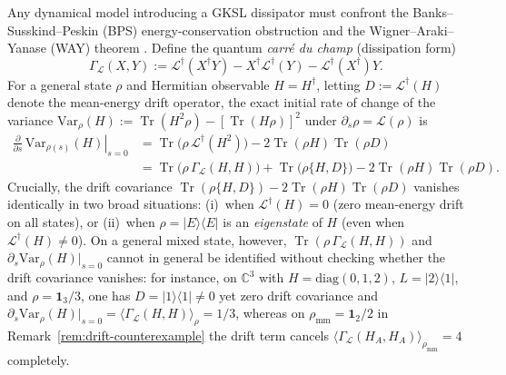 \documentclass[11pt,a4paper]{article}
\theoremstyle{definition}
\theoremstyle{remark}
\newcommand{\Tr}{\operatorname{Tr}}
\newcommand{\cL}{\mathcal{L}}
\newcommand{\bbC}{\mathbb{C}}
\newcommand{\1}{\mathbf{1}}
\begin{document}
Any dynamical model introducing a GKSL dissipator must confront the Banks--Susskind--Peskin (BPS) energy-conservation obstruction \cite{BPS1984} and the Wigner--Araki--Yanase (WAY) theorem \cite{KuramochiTajima2023}. Define the quantum \emph{carr\'e du champ} (dissipation form)
\begin{equation}\label{eq:cdc}
  \Gamma_{\cL}(X, Y) := \cL^\dagger(X^\dagger Y) - X^\dagger \cL^\dagger(Y) - \cL^\dagger(X^\dagger) Y.
\end{equation}
For a general state $\rho$ and Hermitian observable $H = H^\dagger$, letting $D := \cL^\dagger(H)$ denote the mean-energy drift operator, the exact initial rate of change of the variance $\mathrm{Var}_\rho(H) := \Tr(H^2\rho) - [\Tr(H\rho)]^2$ under $\partial_s\rho = \cL(\rho)$ is
\begin{equation}\label{eq:var-decomp-intro}
\begin{aligned}
  \left.\frac{\partial}{\partial s}\,\mathrm{Var}_{\rho(s)}(H)\right|_{s=0}
  &= \Tr\bigl(\rho\,\cL^\dagger(H^2)\bigr) - 2\Tr(\rho H)\Tr(\rho D)\\
  &= \Tr\bigl(\rho\,\Gamma_{\cL}(H,H)\bigr) + \Tr\bigl(\rho\{H,D\}\bigr) - 2\Tr(\rho H)\Tr(\rho D).
\end{aligned}
\end{equation}
Crucially, the drift covariance $\Tr(\rho\{H,D\}) - 2\Tr(\rho H)\Tr(\rho D)$ vanishes identically in two broad situations: (i)~when $\cL^\dagger(H) = 0$ (zero mean-energy drift on all states), or (ii)~when $\rho = |E\rangle\langle E|$ is an \emph{eigenstate} of $H$ (even when $\cL^\dagger(H) \neq 0$). On a general mixed state, however, $\Tr(\rho\,\Gamma_{\cL}(H,H))$ and $\partial_s \mathrm{Var}_{\rho}(H)|_{s=0}$ cannot in general be identified without checking whether the drift covariance vanishes: for instance, on $\bbC^3$ with $H=\mathrm{diag}(0,1,2)$, $L=|2\rangle\langle 1|$, and $\rho=\1_3/3$, one has $D=|1\rangle\langle 1|\neq 0$ yet zero drift covariance and $\partial_s\mathrm{Var}_\rho(H)|_{s=0}=\langle\Gamma_{\cL}(H,H)\rangle_\rho=1/3$, whereas on $\rho_{\mathrm{mm}}=\1_2/2$ in Remark~\ref{rem:drift-counterexample} the drift term cancels $\langle\Gamma_{\cL}(H_A,H_A)\rangle_{\rho_{\mathrm{mm}}}=4$ completely.
\end{document}
